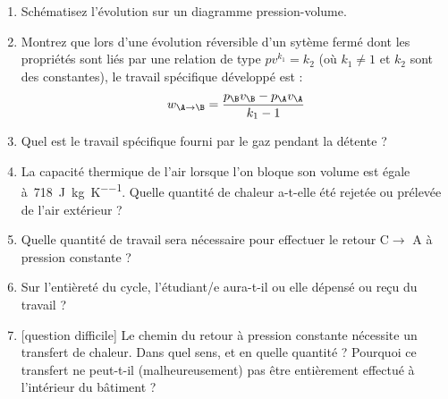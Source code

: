 	\begin{enumerate}
		\item Schématisez l’évolution sur un diagramme pression-volume.
		\item {Montrez que lors d’une évolution réversible d’un sytème fermé dont les propriétés sont liés par une relation de type $p v^{k_1} = k_2$ (où $k_1 \neq 1$ et $k_2$ sont des constantes), le travail spécifique développé est :
				\begin{equation*}
				w_{\A\to\B} = \frac{p_\B v_\B - p_\A v_\A}{k_1 - 1}
				\end{equation*}}
		\item Quel est le travail spécifique fourni par le gaz pendant la détente ?
		\item La capacité thermique de l’air lorsque l’on bloque son volume est égale à~\SI{718}{\joule\per\kilo\gram\per\kelvin}. Quelle quantité de chaleur a-t-elle été rejetée ou prélevée de l’air extérieur ?
		\item Quelle quantité de travail sera nécessaire pour effectuer le retour C$\to$ A à pression constante ?
		\item Sur l’entièreté du cycle, l’étudiant/e aura-t-il ou elle dépensé ou reçu du travail ?
		\item {[question difficile]} Le chemin du retour à pression constante nécessite un transfert de chaleur. Dans quel sens, et en quelle quantité ? Pourquoi ce transfert ne peut-t-il (malheureusement) pas être entièrement effectué à l’intérieur du bâtiment ?
	\end{enumerate}



\exercisesolutionpage
\titreresultats


